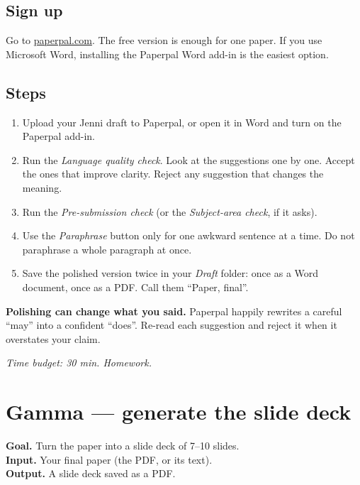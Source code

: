 \documentclass[11pt,a4paper]{article}
\begin{document}
\subsection*{Sign up}
Go to \href{https://paperpal.com/}{paperpal.com}. The free version is enough for one paper. If you use Microsoft Word, installing the Paperpal Word add-in is the easiest option.

\subsection*{Steps}
\begin{enumerate}[leftmargin=*, itemsep=2pt]
  \item Upload your Jenni draft to Paperpal, or open it in Word and turn on the Paperpal add-in.
  \item Run the \emph{Language quality check}. Look at the suggestions one by one. Accept the ones that improve clarity. Reject any suggestion that changes the meaning.
  \item Run the \emph{Pre-submission check} (or the \emph{Subject-area check}, if it asks).
  \item Use the \emph{Paraphrase} button only for one awkward sentence at a time. Do not paraphrase a whole paragraph at once.
  \item Save the polished version twice in your \emph{Draft} folder: once as a Word document, once as a PDF. Call them ``Paper, final''.
\end{enumerate}

\begin{watchout}
\textbf{Polishing can change what you said.} Paperpal happily rewrites a careful ``may'' into a confident ``does''. Re-read each suggestion and reject it when it overstates your claim.
\end{watchout}

\textit{Time budget: 30 min. Homework.}

\section{Gamma --- generate the slide deck}
\label{sec:gamma}

\begin{toolheader}
\textbf{Goal.} Turn the paper into a slide deck of 7--10 slides.\\
\textbf{Input.} Your final paper (the PDF, or its text).\\
\textbf{Output.} A slide deck saved as a PDF.
\end{toolheader}
\end{document}
